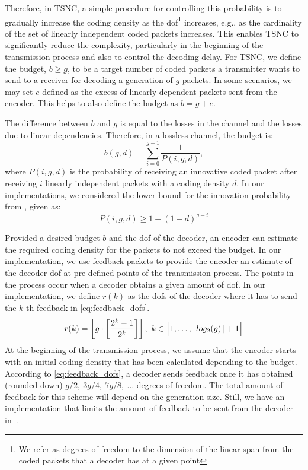 Therefore, in \ac{TSNC}, a simple procedure for controlling this probability
is to gradually increase the coding density as the \ac{dof}\footnote{We refer
as degrees of freedom to the dimension of the linear span from the coded
packets that a decoder has at a given point} increases, e.g., as the
cardinality of the set of linearly independent coded packets increases. This enables
\ac{TSNC} to significantly reduce the complexity, particularly in the
beginning of the transmission process and also to control the decoding
delay. For \ac{TSNC}, we define the budget, $b \geq g$, to be a target
number of coded packets a transmitter wants to send to a receiver
for decoding a generation of $g$ packets. In some scenarios, we may set
$e$ defined as the excess of linearly dependent packets sent from the encoder.
This helps to also define the budget as $b = g + e$.

The difference between $b$ and $g$ is equal to the losses in the channel
and the losses due to linear dependencies. Therefore, in a lossless
channel, the budget is:
\begin{equation}\label{eq:budget}
    b(g,d)=\sum^{g-1}_{i=0}\frac{1}{P(i,g,d)},
\end{equation}
where $P(i,g,d)$ is the probability of receiving an innovative coded packet
after receiving $i$ linearly independent packets with a coding density $d$. In our
implementations, we considered the lower bound for the innovation probability
from \cite{feizi2014tunable}, given as:
\begin{equation}
    P(i,g,d) \geq 1-(1-d)^{g-i}
\end{equation}

Provided a desired budget $b$ and the \ac{dof} of the decoder, an encoder
can estimate the required coding density for the packets to not exceed the
budget. In our implementation, we use feedback packets to provide the
encoder an estimate of the decoder \ac{dof} at pre-defined points of the
transmission process. The points in the process occur when a decoder
obtains a given amount of \ac{dof}. In our implementation, we define $r(k)$ as the \ac{dof}s of the decoder where it has to send the $k$-th feedback in
\eqref{eq:feedback_dofs}.
%
\begin{equation}\label{eq:feedback_dofs}
    r(k) = \left\lfloor g\cdot \left[\frac{2^k -1}{2^k}\right]\right\rfloor,\ k \in \Big[1,\ldots,\left\lceil log_2(g)\right\rceil+1\Big]
\end{equation}
%
At the beginning of the transmission process, we assume that the encoder
starts with an initial coding density that has been calculated depending to
the budget. According to \eqref{eq:feedback_dofs}, a decoder sends feedback
once it has obtained (rounded down) $g/2,\ 3g/4,\ 7g/8,\ \ldots$  degrees of
freedom. The total amount of feedback for this scheme will depend on the
generation size. Still, we have an implementation that limits the amount of
feedback to be sent from the decoder in~\cite{practicalview_tsnc2015}.

